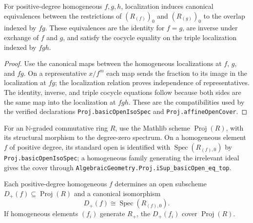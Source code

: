 \begin{lemma}
  \label{lemma:nagata-proj-chart-ring-cocycle}

  For positive-degree homogeneous $f,g,h$, localization induces canonical
  equivalences between the restrictions of $(R_{(f)})_0$ and
  $(R_{(g)})_0$ to the overlap indexed by $fg$.  These equivalences are the
  identity for $f=g$, are inverse under exchange of $f$ and $g$, and satisfy
  the cocycle equality on the triple localization indexed by $fgh$.
\end{lemma}

\begin{proof}
  Use the canonical maps between the homogeneous localizations at $f$, $g$,
  and $fg$.  On a representative $x/f^m$ each map sends the fraction to its
  image in the localization at $fg$; the localization relation proves
  independence of representatives.  The identity, inverse, and triple
  cocycle equations follow because both sides are the same map into the
  localization at $fgh$.  These are the compatibilities used by the verified
  declarations \texttt{Proj.basicOpenIsoSpec} and
  \texttt{Proj.affineOpenCover}.
\end{proof}

\begin{definition}
  \label{def:nagata-affine-proj}
  \leanok

  For an $\mathbb N$-graded commutative ring $R$, use the Mathlib scheme
  $\operatorname{Proj}(R)$, with its structural morphism to the degree-zero
  spectrum.  On a homogeneous element $f$ of positive degree, its standard
  open is identified with $\operatorname{Spec}(R_{(f),0})$ by
  \texttt{Proj.basicOpenIsoSpec}; a homogeneous family generating the
  irrelevant ideal gives the cover through
  \texttt{AlgebraicGeometry.Proj.iSup\_basicOpen\_eq\_top}.
\end{definition}

\begin{proposition}
  \label{prop:nagata-proj-standard-open}
  \leanok

  Each positive-degree homogeneous $f$ determines an open subscheme
  $D_+(f)\subseteq\operatorname{Proj}(R)$ and a canonical isomorphism
  \[
    D_+(f)\cong\operatorname{Spec}(R_{(f),0}).
  \]
  If homogeneous elements $(f_i)$ generate $R_+$, the $D_+(f_i)$ cover
  $\operatorname{Proj}(R)$.
\end{proposition}

